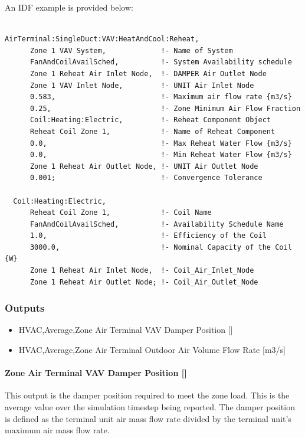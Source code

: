 An IDF example is provided below:

\begin{lstlisting}

AirTerminal:SingleDuct:VAV:HeatAndCool:Reheat,
      Zone 1 VAV System,             !- Name of System
      FanAndCoilAvailSched,          !- System Availability schedule
      Zone 1 Reheat Air Inlet Node,  !- DAMPER Air Outlet Node
      Zone 1 VAV Inlet Node,         !- UNIT Air Inlet Node
      0.583,                         !- Maximum air flow rate {m3/s}
      0.25,                          !- Zone Minimum Air Flow Fraction
      Coil:Heating:Electric,         !- Reheat Component Object
      Reheat Coil Zone 1,            !- Name of Reheat Component
      0.0,                           !- Max Reheat Water Flow {m3/s}
      0.0,                           !- Min Reheat Water Flow {m3/s}
      Zone 1 Reheat Air Outlet Node, !- UNIT Air Outlet Node
      0.001;                         !- Convergence Tolerance

  Coil:Heating:Electric,
      Reheat Coil Zone 1,            !- Coil Name
      FanAndCoilAvailSched,          !- Availability Schedule Name
      1.0,                           !- Efficiency of the Coil
      3000.0,                        !- Nominal Capacity of the Coil {W}
      Zone 1 Reheat Air Inlet Node,  !- Coil_Air_Inlet_Node
      Zone 1 Reheat Air Outlet Node; !- Coil_Air_Outlet_Node
\end{lstlisting}

\subsubsection{Outputs}\label{outputs-4}

\begin{itemize}
\item
  HVAC,Average,Zone Air Terminal VAV Damper Position {[]}
\item
  HVAC,Average,Zone Air Terminal Outdoor Air Volume Flow Rate {[}m3/s{]}
\end{itemize}

\paragraph{Zone Air Terminal VAV Damper Position {[]}}\label{zone-air-terminal-vav-damper-position-2}

This output is the damper position required to meet the zone load. This is the average value over the simulation timestep being reported. The damper position is defined as the terminal unit air mass flow rate divided by the terminal unit's maximum air mass flow rate.

